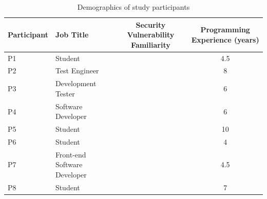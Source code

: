 \documentclass[conference]{IEEEtran}
\begin{document}
\begin{table}
\centering
\caption{Demographics of study participants}
\begin{tabular}{|l|l|c|S|}
\hline
    Participant		& Job Title 						& Security Vulnerability Familiarity 						& Programming Experience (years) \\
    \hline
    P1			    & Student     						&  	&  4.5    \\
    \hline
    P2			    & Test Engineer    					& 		&  8 		\\
    \hline
    P3 				& Development Tester       			& 			&  6 	    	\\
    \hline
    P4				& Software Developer     			& 			&  6     	\\
    \hline
    P5				& Student      						& 			&  10 	\\
    \hline
    P6				& Student		    				& 				& 4		\\
    \hline
    P7				& Front-end Software Developer    	& 		& 4.5         \\
    \hline
    P8				& Student	    					& 		& 7   \\

\end{tabular}
\end{table}
\end{document}
